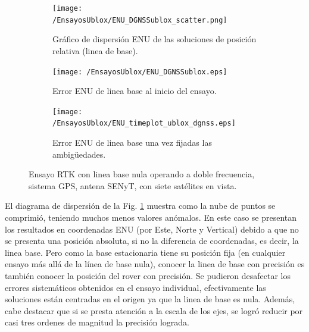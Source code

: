 \documentclass[a4paper,12pt,oneside,onecolumn,final,openright]{book}%
\begin{document}
\begin{figure}
\begin{subfigure}{1\linewidth}
\centering
  	\texttt{[image: /EnsayosUblox/ENU\_DGNSSublox\_scatter.png]}
  	\caption{Gráfico de dispersión ENU de las soluciones de posición relativa (linea de base).}
    \label{fig:scatter_ublox_DGNSS}
\end{subfigure}

\begin{subfigure}{0.49\linewidth}
\centering
 	\texttt{[image: /EnsayosUblox/ENU\_DGNSSublox.eps]}
 	\caption{Error ENU de linea base al inicio del ensayo.}
  	\label{fig:error_ublox_DGNSS_ini}
\end{subfigure}
\begin{subfigure}{0.49\linewidth}
\centering
 	\texttt{[image: /EnsayosUblox/ENU\_timeplot\_ublox\_dgnss.eps]}
 	\caption{Error ENU de linea base una vez fijadas las ambigüedades.}
  	\label{fig:error_ublox_DGNSS_fin}
\end{subfigure}
\caption{Ensayo RTK con linea base nula operando a doble frecuencia, sistema GPS, antena SENyT, con siete satélites en vista.}
\label{fig:ensayoDGNSS_ublox}
\end{figure}
	
	El diagrama de dispersión de la Fig. \ref{fig:scatter_ublox_DGNSS} muestra como la nube de puntos se comprimió, teniendo muchos menos valores anómalos. En este caso se presentan los resultados en coordenadas ENU (por Este, Norte y Vertical) debido a que no se presenta una posición absoluta, si no la diferencia de coordenadas, es decir, la linea base. Pero como la base estacionaria tiene su posición fija (en cualquier ensayo más allá de la línea de base nula), conocer la linea de base con precisión es también conocer la posición del rover con precisión. Se pudieron desafectar los errores sistemáticos obtenidos en el ensayo individual, efectivamente las soluciones están centradas en el origen ya que la linea de base es nula. Además, cabe destacar que si se presta atención a la escala de los ejes, se logró reducir por casi tres ordenes de magnitud la precisión lograda. 
	
\end{document}
